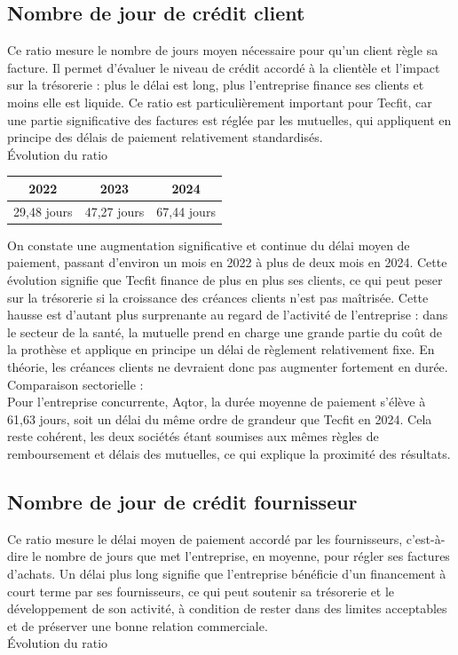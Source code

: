 \subsection{Nombre de jour de crédit client}
Ce ratio mesure le nombre de jours moyen nécessaire pour qu’un client règle sa facture. Il permet d’évaluer le niveau de crédit accordé à la clientèle et l’impact sur la trésorerie : plus le délai est long, plus l’entreprise finance ses clients et moins elle est liquide. Ce ratio est particulièrement important pour Tecfit, car une partie significative des factures est réglée par les mutuelles, qui appliquent en principe des délais de paiement relativement standardisés.\\
Évolution du ratio\\
\begin{table}[h]
\centering
\begin{tabular}{c|c|c}
\textbf{2022} & \textbf{2023} & \textbf{2024} \\
\hline
29,48 jours  & 47,27 jours & 67,44 jours \\
\end{tabular}
\end{table}

On constate une augmentation significative et continue du délai moyen de paiement, passant d’environ un mois en 2022 à plus de deux mois en 2024. Cette évolution signifie que Tecfit finance de plus en plus ses clients, ce qui peut peser sur la trésorerie si la croissance des créances clients n’est pas maîtrisée. Cette hausse est d’autant plus surprenante au regard de l’activité de l’entreprise : dans le secteur de la santé, la mutuelle prend en charge une grande partie du coût de la prothèse et applique en principe un délai de règlement relativement fixe. En théorie, les créances clients ne devraient donc pas augmenter fortement en durée.\\
Comparaison sectorielle :\\
Pour l’entreprise concurrente, Aqtor, la durée moyenne de paiement s’élève à 61,63 jours, soit un délai du même ordre de grandeur que Tecfit en 2024. Cela reste cohérent, les deux sociétés étant soumises aux mêmes règles de remboursement et délais des mutuelles, ce qui explique la proximité des résultats.

\subsection{Nombre de jour de crédit fournisseur}
Ce ratio mesure le délai moyen de paiement accordé par les fournisseurs, c’est-à-dire le nombre de jours que met l’entreprise, en moyenne, pour régler ses factures d’achats. Un délai plus long signifie que l’entreprise bénéficie d’un financement à court terme par ses fournisseurs, ce qui peut soutenir sa trésorerie et le développement de son activité, à condition de rester dans des limites acceptables et de préserver une bonne relation commerciale.\\
Évolution du ratio\\

